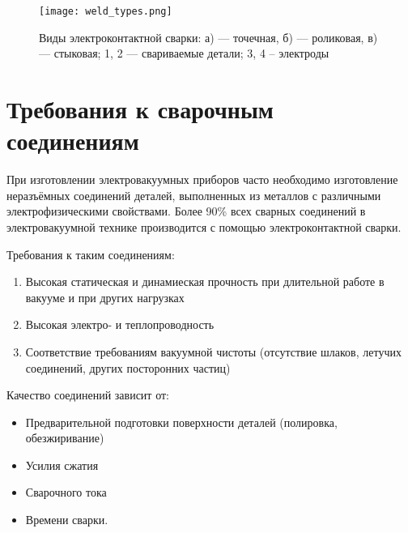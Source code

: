 \documentclass[a4paper]{article}
\begin{document}
\begin{figure}[h]
    \centering
    \texttt{[image: weld\_types.png]}
    \caption{Виды электроконтактной сварки: а) — точечная, б) — роликовая, в) — стыковая; 1, 2 — свариваемые детали; 3, 4 – электроды}
    \label{fig:vac}
\end{figure}

\section{Требования к сварочным соединениям}

При изготовлении электровакуумных приборов часто необходимо изготовление неразъёмных соединений деталей, выполненных из металлов с различными электрофизическими свойствами. Более 90\% всех сварных соединений в электровакуумной технике производится с помощью электроконтактной сварки.\par
Требования к таким соединениям:
\begin{enumerate}
    \item Высокая статическая и динамиеская прочность при длительной работе в вакууме и при других нагрузках
    \item Высокая электро- и теплопроводность
    \item Соответствие требованиям вакуумной чистоты (отсутствие шлаков, летучих соединений, других посторонних частиц)
\end{enumerate}

Качество соединений зависит от:
\begin{itemize}
    \item Предварительной подготовки поверхности деталей (полировка, обезжиривание)
    \item Усилия сжатия
    \item Сварочного тока
    \item Времени сварки.
\end{itemize}
\end{document}
